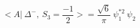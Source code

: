 \begin{equation}
<A|~\Delta^{-},~ S_3=\frac{-1}{2} >= \frac{\sqrt{6}}{\pi} ~\psi_1^{*2}~\psi_2
\end{equation}

